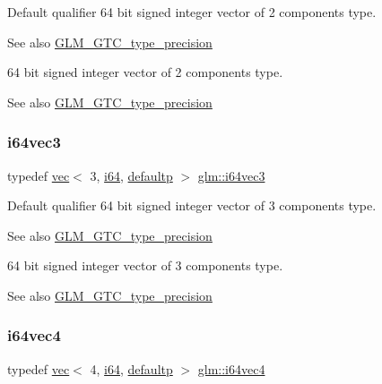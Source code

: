 Default qualifier 64 bit signed integer vector of 2 components type. \begin{DoxySeeAlso}{See also}
\mbox{\hyperlink{group__gtc__type__precision}{G\+L\+M\+\_\+\+G\+T\+C\+\_\+type\+\_\+precision}}
\end{DoxySeeAlso}
64 bit signed integer vector of 2 components type. \begin{DoxySeeAlso}{See also}
\mbox{\hyperlink{group__gtc__type__precision}{G\+L\+M\+\_\+\+G\+T\+C\+\_\+type\+\_\+precision}} 
\end{DoxySeeAlso}
\mbox{\label{group__gtc__type__precision_gad7aa290b2d88847999c1305ed5c82669}} 
\subsubsection{\texorpdfstring{i64vec3}{i64vec3}}
{\footnotesize\ttfamily typedef \mbox{\hyperlink{structglm_1_1vec}{vec}}$<$ 3, \mbox{\hyperlink{group__gtc__type__precision_gac7a7eaad46064fc952b06df33689da23}{i64}}, \mbox{\hyperlink{namespaceglm_a36ed105b07c7746804d7fdc7cc90ff25a9d21ccd8b5a009ec7eb7677befc3bf51}{defaultp}} $>$ \mbox{\hyperlink{group__gtc__type__precision_gad7aa290b2d88847999c1305ed5c82669}{glm\+::i64vec3}}}

Default qualifier 64 bit signed integer vector of 3 components type. \begin{DoxySeeAlso}{See also}
\mbox{\hyperlink{group__gtc__type__precision}{G\+L\+M\+\_\+\+G\+T\+C\+\_\+type\+\_\+precision}}
\end{DoxySeeAlso}
64 bit signed integer vector of 3 components type. \begin{DoxySeeAlso}{See also}
\mbox{\hyperlink{group__gtc__type__precision}{G\+L\+M\+\_\+\+G\+T\+C\+\_\+type\+\_\+precision}} 
\end{DoxySeeAlso}
\mbox{\label{group__gtc__type__precision_ga77db970d924dd55ac93e00391ad4a10e}} 
\subsubsection{\texorpdfstring{i64vec4}{i64vec4}}
{\footnotesize\ttfamily typedef \mbox{\hyperlink{structglm_1_1vec}{vec}}$<$ 4, \mbox{\hyperlink{group__gtc__type__precision_gac7a7eaad46064fc952b06df33689da23}{i64}}, \mbox{\hyperlink{namespaceglm_a36ed105b07c7746804d7fdc7cc90ff25a9d21ccd8b5a009ec7eb7677befc3bf51}{defaultp}} $>$ \mbox{\hyperlink{group__gtc__type__precision_ga77db970d924dd55ac93e00391ad4a10e}{glm\+::i64vec4}}}

